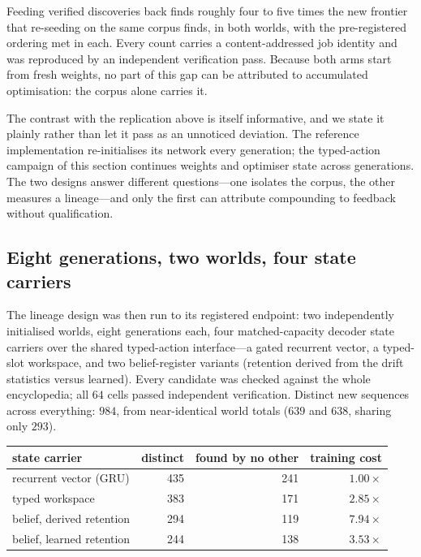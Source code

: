 \documentclass[11pt]{article}
\begin{document}
Feeding verified discoveries back finds roughly four to five times the new frontier that
re-seeding on the same corpus finds, in both worlds, with the pre-registered ordering met
in each. Every count carries a content-addressed job identity and was reproduced by an
independent verification pass. Because both arms start from fresh weights, no part of this
gap can be attributed to accumulated optimisation: the corpus alone carries it.

The contrast with the replication above is itself informative, and we state it plainly
rather than let it pass as an unnoticed deviation. The reference implementation
re-initialises its network every generation; the typed-action campaign of this section
continues weights and optimiser state across generations. The two designs answer different
questions---one isolates the corpus, the other measures a lineage---and only the first can
attribute compounding to feedback without qualification.

\subsection{Eight generations, two worlds, four state carriers}
\label{sec:eightgen}

The lineage design was then run to its registered endpoint: two independently initialised
worlds, eight generations each, four matched-capacity decoder state carriers over the
shared typed-action interface---a gated recurrent vector, a typed-slot workspace, and two
belief-register variants (retention derived from the drift statistics versus learned).
Every candidate was checked against the whole encyclopedia; all $64$ cells passed
independent verification. Distinct new sequences across everything: $984$, from
near-identical world totals ($639$ and $638$, sharing only $293$).

\begin{center}
\begin{tabular}{lrrr}
\toprule
state carrier & distinct & found by no other & training cost \\
\midrule
recurrent vector (GRU) & 435 & 241 & $1.00\times$ \\
typed workspace        & 383 & 171 & $2.85\times$ \\
belief, derived retention & 294 & 119 & $7.94\times$ \\
belief, learned retention & 244 & 138 & $3.53\times$ \\
\bottomrule
\end{tabular}
\end{center}
\end{document}
